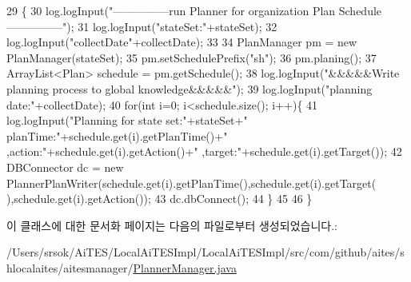 \begin{DoxyCode}
29                       \{
30         log.logInput(\textcolor{stringliteral}{"---------------run Planner for organization Plan Schedule---------------"});
31         log.logInput(\textcolor{stringliteral}{"stateSet:"}+stateSet);
32         log.logInput(\textcolor{stringliteral}{"collectDate"}+collectDate);
33     
34         PlanManager pm = \textcolor{keyword}{new} PlanManager(stateSet);
35         pm.setSchedulePrefix(\textcolor{stringliteral}{"sh"});
36         pm.planing();
37         ArrayList<Plan> schedule = pm.getSchedule();
38         log.logInput(\textcolor{stringliteral}{"&&&&&Write planning process to global knowledge&&&&&"});
39         log.logInput(\textcolor{stringliteral}{"planning date:"}+collectDate);
40         \textcolor{keywordflow}{for}(\textcolor{keywordtype}{int} i=0; i<schedule.size(); i++)\{
41             log.logInput(\textcolor{stringliteral}{"Planning for state set:"}+stateSet+\textcolor{stringliteral}{" planTime:"}+schedule.get(i).getPlanTime()+\textcolor{stringliteral}{"
       ,action:"}+schedule.get(i).getAction()+\textcolor{stringliteral}{" ,target:"}+schedule.get(i).getTarget());
42             DBConnector dc = \textcolor{keyword}{new} PlannerPlanWriter(schedule.get(i).getPlanTime(),schedule.get(i).getTarget(
      ),schedule.get(i).getAction());
43             dc.dbConnect();
44         \}
45         
46     \}
\end{DoxyCode}


이 클래스에 대한 문서화 페이지는 다음의 파일로부터 생성되었습니다.\+:\begin{DoxyCompactItemize}
\item 
/\+Users/srsok/\+Ai\+T\+E\+S/\+Local\+Ai\+T\+E\+S\+Impl/\+Local\+Ai\+T\+E\+S\+Impl/src/com/github/aites/shlocalaites/aitesmanager/\mbox{\hyperlink{_planner_manager_8java}{Planner\+Manager.\+java}}\end{DoxyCompactItemize}
